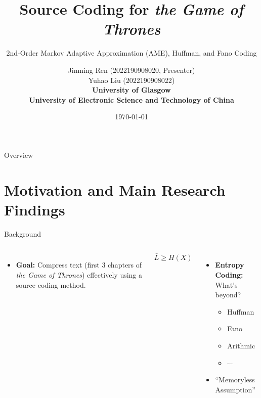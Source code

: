\documentclass[mathserif, 13pt, aspectratio=1610]{beamer}
\title{Source Coding for \textit{the Game of Thrones}}
\subtitle{2nd-Order Markov Adaptive Approximation (AME), Huffman, and Fano Coding}
\author[Jinming Ren (2022190908020), Yuhao Liu (2022190908022)]{Jinming Ren (2022190908020, Presenter) \\ Yuhao Liu (2022190908022) \\
        \vspace{1em} %
        \tiny{\textbf{University of Glasgow}} \\
        \vspace{0.3em}
        \tiny{\textbf{University of Electronic Science and Technology of China}} \\
}
\date{\today}
\begin{document}
\begin{frame}
  \titlepage
\end{frame}

\begin{frame}{Overview}
  \tableofcontents
\end{frame}


\section{Motivation and Main Research Findings}
\begin{frame}{Background}
	\begin{columns}[T]
		\centering
		\hfill
		\begin{itemize}
			\item \textbf{Goal:} Compress text (first 3 chapters of \textit{the Game of Thrones}) effectively using a source coding method.
		\end{itemize}

		\begin{theorem}
			$$
			\bar{L} \geq H(X)
			$$
		\end{theorem}

		\begin{itemize}
			\item \textbf{Entropy Coding:} What's beyond?
			\begin{itemize}
				\item Huffman
				\item Fano
				\item Arithmic
				\item $\cdots$
			\end{itemize}
			\item ``Memoryless Assumption''
		\end{itemize}




\end{columns}
\end{frame}
\end{document}
